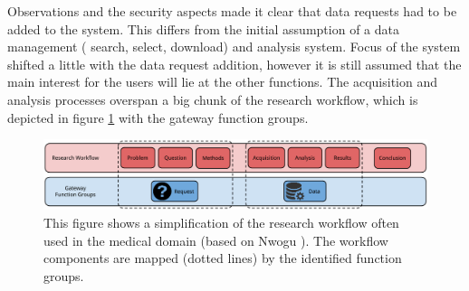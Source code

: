 Observations and the security aspects made it clear that data requests had to be added to the system.
This differs from the initial assumption of a data management (\eg{} search, select, download) and analysis system.
Focus of the system shifted a little with the data request addition, however it is still assumed that the main interest for the users will lie at the other functions.
The acquisition and analysis processes overspan a big chunk of the research workflow, which is depicted in figure \ref{fig:research-workflow} with the gateway function groups.

\begin{figure}[h]
	\centering
	\includegraphics[width=1.0\linewidth]{images/research-workflow}
	\caption{
		This figure shows a simplification of the research workflow often used  in the medical domain (based on Nwogu \cite{nwogu}).
		The workflow components are mapped (dotted lines) by the identified \ivfsystem{} function groups.
	}
	\label{fig:research-workflow}
\end{figure}